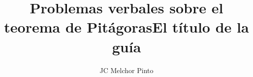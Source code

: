 \documentclass[12pt,addpoints,answers]{guia}
\title{Problemas verbales sobre el teorema de Pitágoras}
\title{El título de la guía}
\author{JC Melchor Pinto}
\begin{document}
\pagestyle{headandfoot}

\INFO
\vspace{-0.5cm}
\begin{multicols}{2}
    
    
    \columnbreak
    
\end{multicols}
\begin{questions}
    \questionboxed[10]{}
    \questionboxed[10]{}
    \questionboxed[10]{}
    \questionboxed[10]{}
    \questionboxed[10]{}
    \questionboxed[10]{}
    \questionboxed[10]{}
    \questionboxed[10]{}
    \questionboxed[10]{}
    \questionboxed[10]{}
\end{questions}
\end{document}
